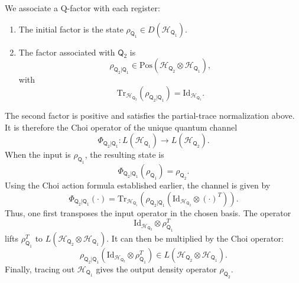 \documentclass[
    aps,
    pra,
    reprint,
    superscriptaddress,
    nofootinbib
]{revtex4-2}
\theoremstyle{definition}
\theoremstyle{plain}
\begin{document}
We associate a Q-factor with each register:
\begin{enumerate}
    \item The initial factor is the state
    $\rho_{\mathsf{Q}_{1}}\in D(\mathcal{H}_{\mathsf{Q}_{1}})$.

    \item The factor associated with $\mathsf{Q}_{2}$ is
    \begin{equation}
        \rho_{\mathsf{Q}_{2}|\mathsf{Q}_{1}}
        \in
        \mathrm{Pos}\left(
            \mathcal{H}_{\mathsf{Q}_{2}}
            \otimes
            \mathcal{H}_{\mathsf{Q}_{1}}
        \right),
    \end{equation}
    with
    \begin{equation}
        \mathrm{Tr}_{\mathcal{H}_{\mathsf{Q}_{2}}}
        \left(
            \rho_{\mathsf{Q}_{2}|\mathsf{Q}_{1}}
        \right)
        =
        \mathrm{Id}_{\mathcal{H}_{\mathsf{Q}_{1}}}.
    \end{equation}
\end{enumerate}
The second factor is positive and satisfies the partial-trace normalization
above. It is therefore the Choi operator of the unique quantum channel
\begin{equation}
    \Phi_{\mathsf{Q}_{2}|\mathsf{Q}_{1}}:
    L(\mathcal{H}_{\mathsf{Q}_{1}})
    \to
    L(\mathcal{H}_{\mathsf{Q}_{2}}).
\end{equation}
When the input is $\rho_{\mathsf{Q}_{1}}$, the resulting state is
\begin{equation}
    \Phi_{\mathsf{Q}_{2}|\mathsf{Q}_{1}}
    \left(\rho_{\mathsf{Q}_{1}}\right)
    =
    \rho_{\mathsf{Q}_{2}}.
\end{equation}
Using the Choi action formula established earlier, the channel is given
by~\cite[Eqs.~(2.65)--(2.66)]{Watrous2018}
\begin{equation}
    \Phi_{\mathsf{Q}_{2}|\mathsf{Q}_{1}}(\cdot)
    =
    \mathrm{Tr}_{\mathcal{H}_{\mathsf{Q}_{1}}}
    \left(
        \rho_{\mathsf{Q}_{2}|\mathsf{Q}_{1}}
        \left(
            \mathrm{Id}_{\mathcal{H}_{\mathsf{Q}_{2}}}
            \otimes
            (\cdot)^{T}
        \right)
    \right).
\end{equation}
Thus, one first transposes the input operator in the chosen basis. The
operator
\begin{equation}
    \mathrm{Id}_{\mathcal{H}_{\mathsf{Q}_{2}}}
    \otimes
    \rho_{\mathsf{Q}_{1}}^{T}
    \label{eq:lifted-operator-1}
\end{equation}
lifts $\rho_{\mathsf{Q}_{1}}^{T}$ to
$L(\mathcal{H}_{\mathsf{Q}_{2}}\otimes
\mathcal{H}_{\mathsf{Q}_{1}})$. It can then be multiplied by the Choi
operator:
\begin{equation}
    \rho_{\mathsf{Q}_{2}|\mathsf{Q}_{1}}
    \left(
        \mathrm{Id}_{\mathcal{H}_{\mathsf{Q}_{2}}}
        \otimes
        \rho_{\mathsf{Q}_{1}}^{T}
    \right)
    \in
    L\left(
        \mathcal{H}_{\mathsf{Q}_{2}}
        \otimes
        \mathcal{H}_{\mathsf{Q}_{1}}
    \right).
\end{equation}
Finally, tracing out $\mathcal{H}_{\mathsf{Q}_{1}}$ gives the output
density operator $\rho_{\mathsf{Q}_{2}}$.
\end{document}
